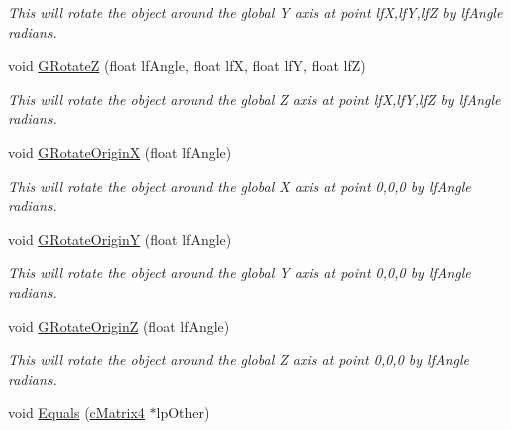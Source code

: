 \begin{DoxyCompactItemize}
\begin{DoxyCompactList}\small\item\em This will rotate the object around the global Y axis at point lfX,lfY,lfZ by lfAngle radians. \end{DoxyCompactList}\item 
\hypertarget{classc_matrix4_a5b357f5686b74e0feeff7eaae070f566}{
void \hyperlink{classc_matrix4_a5b357f5686b74e0feeff7eaae070f566}{GRotateZ} (float lfAngle, float lfX, float lfY, float lfZ)}
\label{classc_matrix4_a5b357f5686b74e0feeff7eaae070f566}

\begin{DoxyCompactList}\small\item\em This will rotate the object around the global Z axis at point lfX,lfY,lfZ by lfAngle radians. \end{DoxyCompactList}\item 
\hypertarget{classc_matrix4_a3ddcb503ea46911e194a9b881a6f0bee}{
void \hyperlink{classc_matrix4_a3ddcb503ea46911e194a9b881a6f0bee}{GRotateOriginX} (float lfAngle)}
\label{classc_matrix4_a3ddcb503ea46911e194a9b881a6f0bee}

\begin{DoxyCompactList}\small\item\em This will rotate the object around the global X axis at point 0,0,0 by lfAngle radians. \end{DoxyCompactList}\item 
\hypertarget{classc_matrix4_abe68a204b91201b33adc32f5b354631e}{
void \hyperlink{classc_matrix4_abe68a204b91201b33adc32f5b354631e}{GRotateOriginY} (float lfAngle)}
\label{classc_matrix4_abe68a204b91201b33adc32f5b354631e}

\begin{DoxyCompactList}\small\item\em This will rotate the object around the global Y axis at point 0,0,0 by lfAngle radians. \end{DoxyCompactList}\item 
\hypertarget{classc_matrix4_af5ecfcfab719acf23ddb1148ad24825a}{
void \hyperlink{classc_matrix4_af5ecfcfab719acf23ddb1148ad24825a}{GRotateOriginZ} (float lfAngle)}
\label{classc_matrix4_af5ecfcfab719acf23ddb1148ad24825a}

\begin{DoxyCompactList}\small\item\em This will rotate the object around the global Z axis at point 0,0,0 by lfAngle radians. \end{DoxyCompactList}\item 
\hypertarget{classc_matrix4_a943edd1e04048bd2bcb93987a6c47819}{
void \hyperlink{classc_matrix4_a943edd1e04048bd2bcb93987a6c47819}{Equals} (\hyperlink{classc_matrix4}{cMatrix4} $\ast$lpOther)}
\label{classc_matrix4_a943edd1e04048bd2bcb93987a6c47819}


\end{DoxyCompactItemize}
